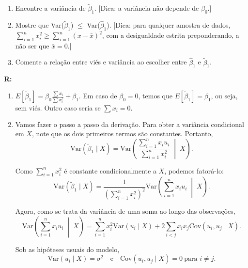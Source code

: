\documentclass[12pt,letterpaper, onecolumn]{exam}
\renewenvironment{solution}
  {\par\noindent\textbf{R:}\enspace\color{blue}}
  {\par\color{black}}
\begin{document}
\begin{questions}
\begin{enumerate}[label=(\alph*)]
    \item Encontre a variância de $\tilde \beta_1$. [Dica: a variância não depende de $\beta_0$.]

    \item Mostre que Var($\tilde \beta_1$) $\leq$ Var($\hat \beta_1$). [Dica: para qualquer amostra de dados, $\sum^n_{i = 1}x^2_i \geq \sum^n_{i=1}(x - \bar{x})^2$, com a desigualdade estrita preponderando, a não ser que $\bar{x} = 0$.]

    \item Comente a relação entre viés e variância ao escolher entre $\hat \beta_1$ e $\tilde \beta_1$.
    \end{enumerate}
\begin{solution}
    \begin{enumerate}[label = (\alph*)]
        \item $E[\tilde \beta_1] = \beta_0 \frac{\sum x_i}{\sum x_i^2} + \beta_1$. Em caso de $\beta_0 = 0$, temos que $E[\tilde \beta_1] = \beta_1$, ou seja, sem viés. Outro caso seria se $\sum x_i = 0$.


        
        \item Vamos fazer o passo a passo da derivação. Para obter a variância condicional em \(X\), note que os dois primeiros termos são constantes. Portanto,
            \[
            \mathrm{Var}(\tilde{\beta}_1 \mid X)
            =
            \mathrm{Var}\left(
            \frac{\sum_{i=1}^n x_i u_i}{\sum_{i=1}^n x_i^2}
            \;\middle|\;
            X
            \right).
            \]
            
            Como \(\sum_{i=1}^n x_i^2\) é constante condicionalmente a \(X\), podemos fatorá-lo:
            \[
            \mathrm{Var}(\tilde{\beta}_1 \mid X)
            =
            \frac{1}{\left(\sum_{i=1}^n x_i^2\right)^2}
            \mathrm{Var}\left(
            \sum_{i=1}^n x_i u_i
            \;\middle|\;
            X
            \right).
            \]
            
            Agora, como se trata da variância de uma soma ao longo das observações,
            \[
            \mathrm{Var}\left(
            \sum_{i=1}^n x_i u_i
            \;\middle|\;
            X
            \right)
            =
            \sum_{i=1}^n x_i^2 \mathrm{Var}(u_i\mid X)
            +
            2\sum_{i<j} x_i x_j \mathrm{Cov}(u_i,u_j\mid X).
            \]
            
            Sob as hipóteses usuais do modelo,
            \[
            \mathrm{Var}(u_i\mid X)=\sigma^2
            \quad \text{e} \quad
            \mathrm{Cov}(u_i,u_j\mid X)=0 \ \text{para } i\neq j.
            \]
            

\end{enumerate}
\end{solution}
\end{questions}
\end{document}
